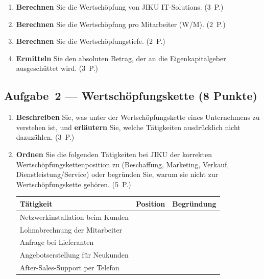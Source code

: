 \documentclass[11pt, a4paper]{article}
\begin{document}
\begin{enumerate}[label=(\alph*)]
  \item \textbf{Berechnen} Sie die Wertschöpfung von JIKU IT-Solutions. \hfill (3~P.)

  \vspace{5cm}

  \item \textbf{Berechnen} Sie die Wertschöpfung pro Mitarbeiter (W/M). \hfill (2~P.)

  \vspace{4cm}

  \item \textbf{Berechnen} Sie die Wertschöpfungstiefe. \hfill (2~P.)

  \vspace{4cm}

  \item \textbf{Ermitteln} Sie den absoluten Betrag, der an die Eigenkapitalgeber
  ausgeschüttet wird. \hfill (3~P.)

  \vspace{4.5cm}
\end{enumerate}

\subsection*{Aufgabe~2 --- Wertschöpfungskette (8 Punkte)}

\begin{enumerate}[label=(\alph*)]
  \item \textbf{Beschreiben} Sie, was unter der Wertschöpfungskette eines Unternehmens
  zu verstehen ist, und \textbf{erläutern} Sie, welche Tätigkeiten ausdrücklich nicht
  dazuzählen. \hfill (3~P.)

  \vspace{5cm}

  \item \textbf{Ordnen} Sie die folgenden Tätigkeiten bei JIKU der korrekten
  Wertschöpfungskettenposition zu (Beschaffung, Marketing, Verkauf, Dienstleistung/Service)
  oder begründen Sie, warum sie nicht zur Wertschöpfungskette gehören. \hfill (5~P.)

  \bigskip

  \noindent
  \begin{tabular}{|p{4.5cm}|p{3.5cm}|p{5cm}|}
  \hline
  \textbf{Tätigkeit} & \textbf{Position} & \textbf{Begründung}\\
  \hline
  Netzwerkinstallation beim Kunden & & \\[0.8cm]
  \hline
  Lohnabrechnung der Mitarbeiter & & \\[0.8cm]
  \hline
  Anfrage bei Lieferanten & & \\[0.8cm]
  \hline
  Angebotserstellung für Neukunden & & \\[0.8cm]
  \hline
  After-Sales-Support per Telefon & & \\[0.8cm]
  \hline
  \end{tabular}
\end{enumerate}
\end{document}
